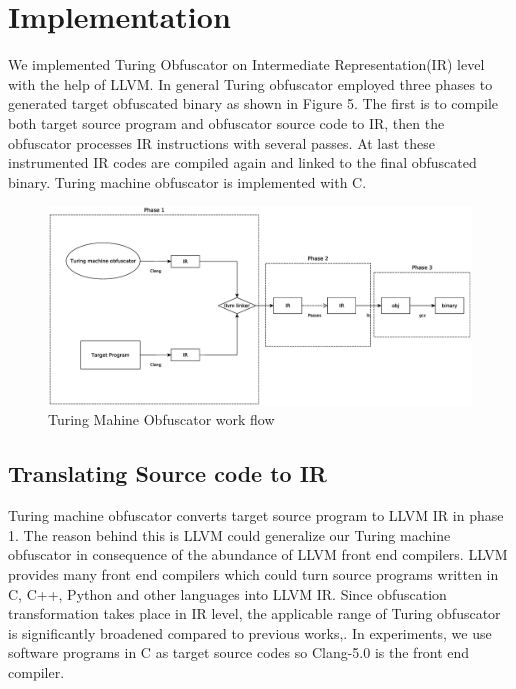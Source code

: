 \documentclass[lnicst]{svmultln}
\begin{document}
\section{Implementation}
We implemented Turing Obfuscator on Intermediate Representation(IR) level with the help of LLVM\cite{LLVM}. In general Turing obfuscator employed three phases to generated target obfuscated binary as shown in Figure 5. The first is to compile both target source program and obfuscator source code to IR, then the obfuscator processes IR instructions with several passes. At last these instrumented IR codes are compiled again and linked to the final obfuscated binary. Turing machine obfuscator is implemented with C. 
\begin{figure}
 \includegraphics[width=\linewidth]{llvm-flow.eps}
 \caption{Turing Mahine Obfuscator work flow}
 \label{Figure 5}
\end{figure}
\subsection{Translating Source code to IR}
Turing machine obfuscator converts target source program to LLVM IR in phase 1. The reason behind this is LLVM could generalize our Turing machine obfuscator in consequence of the abundance of LLVM front end compilers. LLVM provides many front end compilers which could turn source programs written in C, C++, Python and other languages into LLVM IR. Since obfuscation transformation takes place in IR level, the applicable range of Turing obfuscator is significantly broadened compared to previous works\cite{Ma},\cite{Zhi}. In experiments, we use software programs in C as target source codes so Clang-5.0 is the front end compiler.
\end{document}
